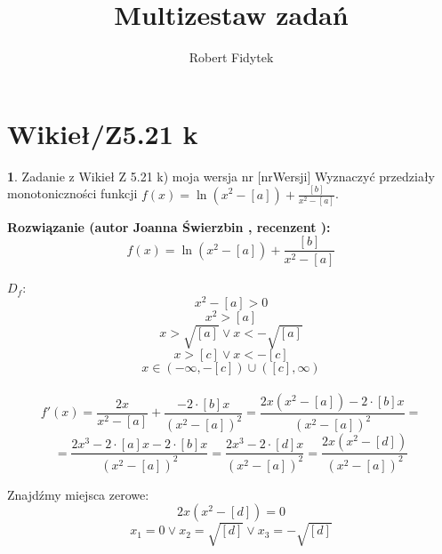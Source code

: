 \documentclass[12pt, a4paper]{article}
\title{Multizestaw zadań}
\author{Robert Fidytek}
\date{}
\theoremstyle{definition} %
\newtheorem{zad}{}
\newcommand{\kategoria}[1]{\section{#1}} %
\newcommand{\zadStart}[1]{\begin{zad}#1\newline} %
\newcommand{\zadStop}{\end{zad}}   %
\newcommand{\rozwStart}[2]{\noindent \textbf{Rozwiązanie (autor #1 , recenzent #2): }\newline} %
\begin{document}
\maketitle


\kategoria{Wikieł/Z5.21 k}
\zadStart{Zadanie z Wikieł Z 5.21 k) moja wersja nr [nrWersji]}
Wyznaczyć przedziały monotoniczności funkcji $f(x)=\ln(x^2-[a])+\frac{[b]}{x^2-[a]}$.
\zadStop
\rozwStart{Joanna Świerzbin}{}
$$f(x)=\ln(x^2-[a])+\frac{[b]}{x^2-[a]}$$
\\
$D_f:$
$$x^2-[a] > 0 $$
$$x^2 > [a] $$
$$x > \sqrt{[a]} \lor x < -\sqrt{[a]} $$
$$x > [c] \lor x < -[c] $$
$$x \in (-\infty,-[c]) \cup ([c], \infty) $$
\\
$$f'(x)=\frac{2x}{x^2-[a]}+\frac{-2\cdot[b]x}{(x^2-[a])^2} = \frac{2x(x^2-[a])-2\cdot[b]x}{(x^2-[a])^2}=$$
$$= \frac{2x^3-2\cdot[a]x-2\cdot[b]x}{(x^2-[a])^2}=\frac{2x^3-2\cdot[d]x}{(x^2-[a])^2}=\frac{2x(x^2-[d])}{(x^2-[a])^2}$$

Znajdźmy miejsca zerowe:
$$2x(x^2-[d])=0$$
$$x_1=0 \lor x_2=\sqrt{[d]} \lor x_3=-\sqrt{[d]} $$
\end{document}
